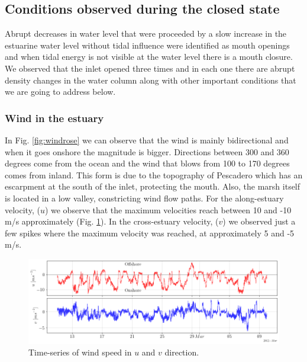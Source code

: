 \documentclass[tesis.tex]{subfiles}
\begin{document}
\subsection{Conditions observed during the closed state}

Abrupt decreases in water level that were proceeded by a slow increase in the estuarine water level without tidal influence were identified as mouth openings and when tidal energy is not visible at the water level there is a mouth closure. We observed that the inlet opened three times and in each one there are abrupt density changes in the water column along with other important conditions that we are going to address below.

\subsubsection{Wind in the estuary}

In Fig. \ref{fig:windrose} we can observe that the wind is mainly bidirectional and when it goes onshore the magnitude is bigger. Directions between 300 and 360 degrees come from the ocean and the wind that blows from 100 to 170 degrees comes from inland. This form is due to the topography of Pescadero which has an escarpment at the south of the inlet, protecting the mouth. Also, the marsh itself is located in a low valley, constricting wind flow paths. For the along-estuary velocity, ($u$) we observe that the maximum velocities reach between 10 and -10 m/s approximately (Fig. \ref{fig:windvel}). In the cross-estuary velocity, ($v$) we observed just a few spikes where the maximum velocity was reached, at approximately 5 and -5 m/s. 

\begin{figure}[h!]
  \centering
  \includegraphics[width=\textwidth]{Imagenes/wind_vel.png}
  \caption{Time-series of wind speed in $u$ and $v$ direction.}
  \label{fig:windvel}
\end{figure}
\end{document}
